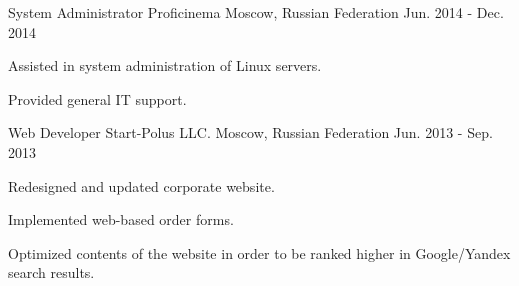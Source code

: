 \begin{cventries}
\cventry
{System Administrator} %
{Proficinema} %
{Moscow, Russian Federation} %
{Jun. 2014 - Dec. 2014} %
{
	\begin{cvitems} %
		\item {Assisted in system administration of Linux servers.}
		\item {Provided general IT support.}
	\end{cvitems}
}

  \cventry
    {Web Developer} %
    {Start-Polus LLC.} %
    {Moscow, Russian Federation} %
    {Jun. 2013 - Sep. 2013} %
    {
      \begin{cvitems} %
        \item {Redesigned and updated corporate website.}
        \item {Implemented web-based order forms.}
        \item {Optimized contents of the website in order to be ranked higher in Google/Yandex search results.}
      \end{cvitems}
    }
\end{cventries}
